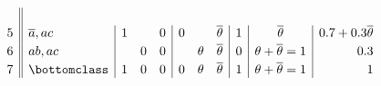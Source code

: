 \documentclass{article}
\begin{document}
\begin{equation*}
\begin{array}{c||l|ccc|ccc|c|c|r}
		\\[2pt]
		5
		  & \co{a}, ac
		  & 1                                         &        & 0
		  & 0                                         &        & \co{\theta}
		  & 1
		  & \co{\theta}
		  & 0.7 + 0.3\co{\theta}
		\\[2pt]
		6
		  & ab, ac
		  &                                           & 0      & 0
		  &                                           & \theta & \co{\theta}
		  & 0
		  & \theta + \co{\theta} = 1
		  & 0.3
		\\[2pt]
		7
		  & \bottomclass
		  & 1                                         & 0      & 0
		  & 0                                         & \theta & \co{\theta}
		  & 1
		  & \theta + \co{\theta} = 1
		  & 1
	\end{array}
\end{equation*}
\end{document}

